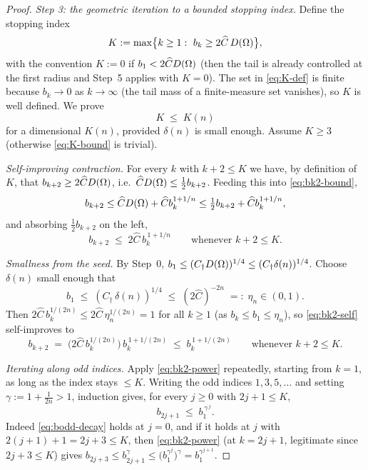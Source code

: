 \begin{proof}
\smallskip
\emph{Step 3: the geometric iteration to a bounded stopping index.}
Define the stopping index
\begin{equation}\label{eq:K-def}
   K:=\max\bigl\{k\ge1:\ b_k\ge2\widehat C\,D(\Omega)\bigr\},
\end{equation}
with the convention $K:=0$ if $b_1<2\widehat C D(\Omega)$ (then the tail is
already controlled at the first radius and Step~5 applies with $K=0$).
The set in \eqref{eq:K-def} is finite because $b_k\to0$ as $k\to\infty$
(the tail mass of a finite-measure set vanishes), so $K$ is well defined.
We prove
\begin{equation}\label{eq:K-bound}
   K\;\le\;K(n)
\end{equation}
for a dimensional $K(n)$, provided $\delta(n)$ is small enough. Assume
$K\ge3$ (otherwise \eqref{eq:K-bound} is trivial).

\emph{Self-improving contraction.} For every $k$ with $k+2\le K$ we have,
by definition of $K$, that $b_{k+2}\ge2\widehat C D(\Omega)$, i.e.\
$\widehat C D(\Omega)\le\tfrac12 b_{k+2}$. Feeding this into
\eqref{eq:bk2-bound},
\[
   b_{k+2}\le\widehat C D(\Omega)+\widehat C b_k^{1+1/n}
   \le\tfrac12 b_{k+2}+\widehat C b_k^{1+1/n},
\]
and absorbing $\tfrac12 b_{k+2}$ on the left,
\begin{equation}\label{eq:bk2-self}
   b_{k+2}\;\le\;2\widehat C\,b_k^{\,1+1/n}
   \qquad\text{whenever }k+2\le K .
\end{equation}

\emph{Smallness from the seed.} By Step~0, $b_1\le(C_\dagger D(\Omega))^{1/4}
\le(C_\dagger\delta(n))^{1/4}$. Choose $\delta(n)$ small enough that
\begin{equation}\label{eq:seed-smallness}
   b_1\;\le\;(C_\dagger\,\delta(n))^{1/4}\;\le\;(2\widehat C)^{-2n}
   \;=:\;\eta_n\in(0,1).
\end{equation}
Then $2\widehat C\,b_k^{1/(2n)}\le2\widehat C\,\eta_n^{1/(2n)}=1$ for all
$k\ge1$ (as $b_k\le b_1\le\eta_n$), so \eqref{eq:bk2-self} self-improves
to
\begin{equation}\label{eq:bk2-power}
   b_{k+2}\;=\;\bigl(2\widehat C\,b_k^{1/(2n)}\bigr)\,b_k^{\,1+1/(2n)}
   \;\le\;b_k^{\,1+1/(2n)}\qquad\text{whenever }k+2\le K .
\end{equation}

\emph{Iterating along odd indices.} Apply \eqref{eq:bk2-power} repeatedly,
starting from $k=1$, as long as the index stays $\le K$. Writing the odd
indices $1,3,5,\dots$ and setting $\gamma:=1+\tfrac1{2n}>1$, induction
gives, for every $j\ge0$ with $2j+1\le K$,
\begin{equation}\label{eq:bodd-decay}
   b_{2j+1}\;\le\;b_1^{\,\gamma^{\,j}} .
\end{equation}
Indeed \eqref{eq:bodd-decay} holds at $j=0$, and if it holds at $j$ with
$2(j+1)+1=2j+3\le K$, then \eqref{eq:bk2-power} (at $k=2j+1$, legitimate
since $2j+3\le K$) gives
$b_{2j+3}\le b_{2j+1}^{\gamma}\le\bigl(b_1^{\gamma^{j}}\bigr)^{\gamma}
=b_1^{\gamma^{j+1}}$.


\end{proof}
